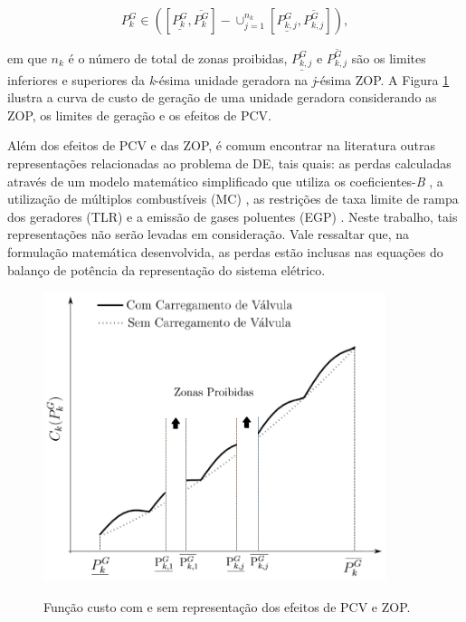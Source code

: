 \documentclass[
	12pt,				%
	openany,			%
	twoside,			%
	a4paper,			%
	chapter=TITLE,		%
	section=Title,		%
	subsection=Title,	%
	subsubsection=Title,%
	english,			%
	french,				%
	spanish,			%
	brazil			%
	]{abntex2}
\begin{document}
\begin{ERRATA}


\begin{equation} \label{ZOPEQ}
P^{G}_k \in ([\underline{P^{G}_k}, \overline{P^{G}_k}]-\cup_{j=1}^{n_k}[\underline{P^{G}_{k,j}}, \overline{P^{G}_{k,j}}]),
\end{equation}

\noindent em que $n_k$ é o número de total de zonas proibidas, $\underline{P^{G}_{k,j}}$ e $\overline{P^{G}_{k,j}}$ são os limites inferiores e superiores da \emph{k}-ésima unidade geradora na \emph{j}-ésima ZOP. A Figura \ref{FIGZOP} ilustra a curva de custo de geração de uma unidade geradora considerando as ZOP, os limites de geração e os efeitos de PCV.

Além dos efeitos de PCV e das ZOP, é comum encontrar na literatura outras representações relacionadas ao problema de DE, tais quais: as perdas calculadas através de um modelo matemático simplificado que utiliza os coeficientes-\emph{B} \cite{dissertacaodiego}, a utilização de múltiplos combustíveis (MC) \cite{kasma}, as restrições de taxa limite de rampa dos geradores (TLR) \cite{rampa} e a emissão de gases poluentes (EGP) \cite{PG-PSO-NR}. Neste trabalho, tais representações não serão levadas em consideração. Vale ressaltar que, na formulação matemática desenvolvida, as perdas estão inclusas nas equações do balanço de potência da representação do sistema elétrico.


\begin{figure}[!h]
\centering
\caption{Função custo com e sem representação dos efeitos de PCV e ZOP.}
\includegraphics[width=100mm]{images/ZOP.png}
\label{FIGZOP}
\end{figure}


\end{ERRATA}
\end{document}

